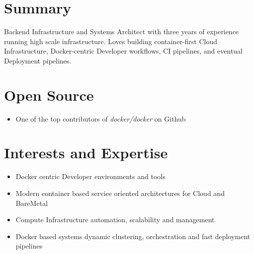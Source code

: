 \documentclass[margin]{res}
\begin{document}

\address{ \textbf{Web}:\hspace{1mm}\href{http://ankush.io/}{ankush.io}\hspace{5mm} \textbf{Github}:\hspace{1mm}\href{https://github.com/ankushagarwal}{ankushagarwal}\hspace{5mm}      \textbf{Email}:\hspace{1mm}\href{mailto:ankushagarwal11@gmail.com}{ankushagarwal11@gmail.com} }

\begin{resume}

\section{Summary}

  Backend Infrastructure and Systems Architect with three years of experience running high scale infrastructure. Loves building container-first Cloud Infrastructure, Docker-centric Developer workflows, CI pipelines, and eventual Deployment pipelines.

\section{Open Source}
 \begin{itemize} \itemsep -2pt  %
 \item One of the top contributors of \textit{docker/docker} on Github
 \end{itemize}

\section{Interests and Expertise}
 \begin{itemize} \itemsep -2pt  %
  \item Docker centric Developer environments and tools 
 \item Modern container based service oriented architectures for Cloud and BareMetal
 \item Compute Infrastructure automation, scalability and management
 \item Docker based systems dynamic clustering, orchestration and fast deployment pipelines
 \end{itemize}


\end{resume}
\end{document}
